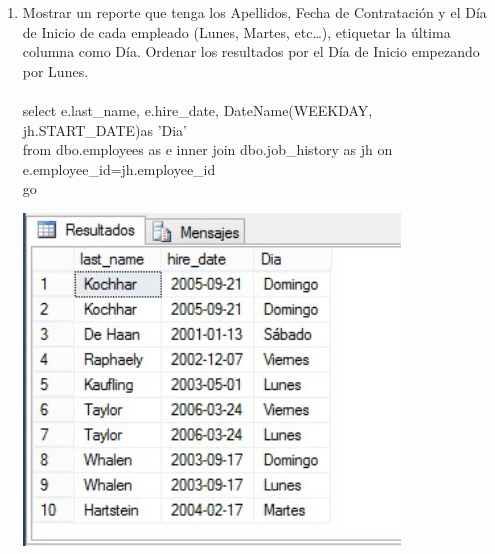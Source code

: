 \begin{enumerate}[1.]
	\item Mostrar un reporte que tenga los Apellidos, Fecha de Contrataci\'on y el D\'ia de Inicio de cada empleado (Lunes, Martes, etc…), etiquetar la \'ultima columna como D\'ia. Ordenar los resultados por el D\'ia de Inicio empezando por Lunes.
	\\
	\\select e.last\_name, e.hire\_date, DateName(WEEKDAY, jh.START\_DATE)as 'Dia' 
	\\from dbo.employees as e inner join dbo.job\_history as jh on 
	\\e.employee\_id=jh.employee\_id
	\\go
	\\
	\begin{center}
	\includegraphics[width=10cm]{./Imagenes/img03} 
	\end{center}


\end{enumerate}
